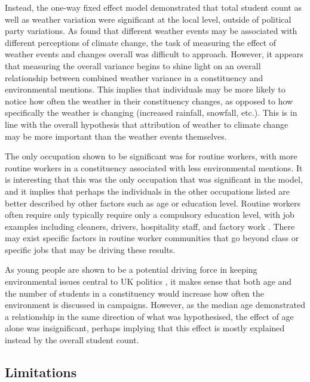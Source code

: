 \documentclass[preprint]{elsarticle} %
\begin{document}
Instead, the one-way fixed effect model demonstrated that total student count as well as weather variation were significant at the local level, outside of political party variations. As \citet{loComeRainShine2015} found that different weather events may be associated with different perceptions of climate change, the task of measuring the effect of weather events and changes overall was difficult to approach. However, it appears that measuring the overall variance begins to shine light on an overall relationship between combined weather variance in a constituency and environmental mentions. This implies that individuals may be more likely to notice how often the weather in their constituency changes, as opposed to how specifically the weather is changing (increased rainfall, snowfall, etc.). This is in line with the overall hypothesis that attribution of weather to climate change may be more important than the weather events themselves.

The only occupation shown to be significant was for routine workers, with more routine workers in a constituency associated with less environmental mentions. It is interesting that this was the only occupation that was significant in the model, and it implies that perhaps the individuals in the other occupations listed are better described by other factors such as age or education level. Routine workers often require only  typically require only a
compulsory education level, with job examples including cleaners, drivers, hospitality staff, and factory work \citep{binesRoutineManualWorkers2024}. There may exist specific factors in routine worker communities that go beyond class or specific jobs that may be driving these results. 

As young people are shown to be a potential driving force in keeping environmental issues central to UK politics \citep{burnsWillBrexitDegrade2020}, it makes sense that both age and the number of students in a constituency would increase how often the environment is discussed in campaigns. However, as the median age demonstrated a relationship in the same direction of what was hypothesised, the effect of age alone was insignificant, perhaps implying that this effect is mostly explained instead by the overall student count. 




\subsection{Limitations}
\end{document}
